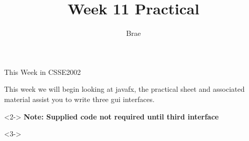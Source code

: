 

\title{Week 11 Practical}
\author{Brae}



\begin{frame}
\titlepage
\end{frame}

\begin{frame}[t, fragile]{This Week in CSSE2002} \vspace{4pt}

This week we will begin looking at javafx, the practical sheet and associated material assist you to write three gui interfaces.

\begin{onlyenv}<2->
\textbf{Note: Supplied code not required until third interface}
\end{onlyenv}

\begin{onlyenv}<3->


\end{onlyenv}
\end{frame}
